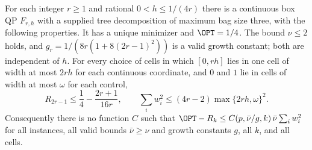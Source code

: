\begin{proposition}\label{lim:prop:moments}
For each integer $r\ge1$ and rational $0<h\le1/(4r)$ there is a continuous
box QP $F_{r,h}$ with a supplied tree decomposition of maximum bag size
three, with the following properties. It has a unique minimizer and
$\OPT=1/4$. The bound $\nu\le2$ holds, and
$g_r=1/(8r(1+8(2r-1)^2))$ is a valid growth constant; both are independent
of $h$. For every choice of cells in which $[0,rh]$ lies in one cell of
width at most $2rh$ for each continuous coordinate, and $0$ and $1$ lie in
cells of width at most $\omega$ for each control,
\[
R_{2r-1}\le\frac14-\frac{2r+1}{16r},\qquad
\sum_iw_i^2\le(4r-2)\max\{2rh,\omega\}^2 .
\]
Consequently there is no function $C$ such that
$\OPT-R_k\le C(p,\bar\nu/g,k)\,\bar\nu\sum_iw_i^2$ for all instances, all
valid bounds $\bar\nu\ge\nu$ and growth constants $g$, all $k$, and all
cells.
\end{proposition}


